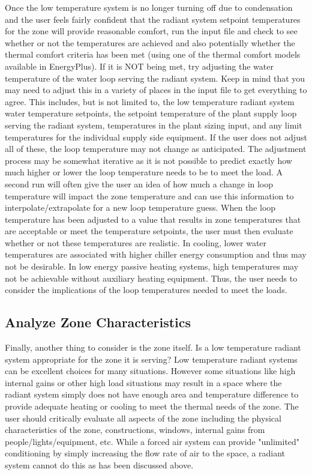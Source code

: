 Once the low temperature system is no longer turning off due to condensation and the user feels fairly confident that the radiant system setpoint temperatures for the zone will provide reasonable comfort, run the input file and check to see whether or not the temperatures are achieved and also potentially whether the thermal comfort criteria has been met (using one of the thermal comfort models available in EnergyPlus).  If it is NOT being met, try adjusting the water temperature of the water loop serving the radiant system.  Keep in mind that you may need to adjust this in a variety of places in the input file to get everything to agree.  This includes, but is not limited to, the low temperature radiant system water temperature setpoints, the setpoint temperature of the plant supply loop serving the radiant system, temperatures in the plant sizing input, and any limit temperatures for the individual supply side equipment.  If the user does not adjust all of these, the loop temperature may not change as anticipated.  The adjustment process may be somewhat iterative as it is not possible to predict exactly how much higher or lower the loop temperature needs to be to meet the load.  A second run will often give the user an idea of how much a change in loop temperature will impact the zone temperature and can use this information to interpolate/extrapolate for a new loop temperature guess.
When the loop temperature has been adjusted to a value that results in zone temperatures that are acceptable or meet the temperature setpoints, the user must then evaluate whether or not these temperatures are realistic.  In cooling, lower water temperatures are associated with higher chiller energy consumption and thus may not be desirable.  In low energy passive heating systems, high temperatures may not be achievable without auxiliary heating equipment.  Thus, the user needs to consider the implications of the loop temperatures needed to meet the loads.

\subsection{Analyze Zone Characteristics}\label{analyze-zone-characteristics}

Finally, another thing to consider is the zone itself.  Is a low temperature radiant system appropriate for the zone it is serving?  Low temperature radiant systems can be excellent choices for many situations.  However some situations like high internal gains or other high load situations may result in a space where the radiant system simply does not have enough area and temperature difference to provide adequate heating or cooling to meet the thermal needs of the zone.  The user should critically evaluate all aspects of the zone including the physical characteristics of the zone, constructions, windows, internal gains from people/lights/equipment, etc.  While a forced air system can provide "unlimited" conditioning by simply increasing the flow rate of air to the space, a radiant system cannot do this as has been discussed above.

